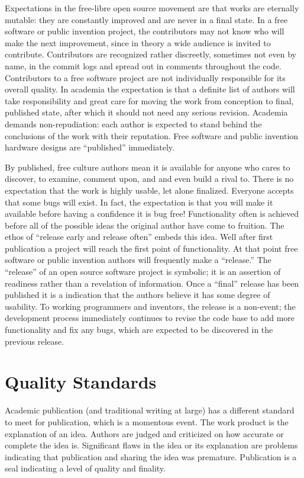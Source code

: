 \documentclass[
	fontsize=10pt, %
	twoside=false, %
	secnumdepth=1, %
]{kaobook}
\begin{document}
Expectations in the free-libre open source movement are that works are eternally mutable: they are
constantly improved and are never in a final state. In a free software
or public invention
project, the contributors may not know who will make the next
improvement, since in theory a wide audience is invited to
contribute. Contributors are recognized rather discreetly, sometimes
not even by name, in the commit logs and spread out in comments
throughout the code. Contributors to a free software project are not
individually responsible for its overall quality.  In academia the
expectation is that a definite list of authors will take
responsibility and great care for moving the work from conception to
final, published state, after which it should not need any serious
revision. Academia demands non-repudiation: each author is expected to
stand behind the conclusions of the work with their reputation.  Free
software and public invention hardware designs are “published” immediately.

By published, free culture
authors mean it is available for anyone who cares to discover, to
examine, comment upon, and and even build a rival to. There is no
expectation that the work is highly usable, let alone
finalized. Everyone accepts that some bugs will exist. In fact, the
expectation is that you will make it available before having a
confidence it is bug free! Functionality often is achieved before all
of the possible ideas the original author have come to fruition. The
ethos of “release early and release often” embeds this idea. Well
after first publication a project will reach the first point of
functionality. At that point free software or public invention authors will frequently
make a “release.” The “release” of an open source software project is
symbolic; it is an assertion of readiness rather than a revelation of
information. Once a “final” release has been published it is a
indication that the authors believe it has some degree of
usability. To working programmers and inventors, the release is a non-event; the
development process immediately continues to revise the code base to
add more functionality and fix any bugs, which are expected to be
discovered in the previous release.

\section{Quality Standards}

Academic publication (and traditional writing at large) has a
different standard to meet for publication, which is a momentous
event. The work product is the explanation of an idea. Authors are
judged and criticized on how accurate or complete the idea
is. Significant flaws in the idea or its explanation are problems
indicating that publication and sharing the idea was
premature. Publication is a seal indicating a level of quality and
finality.
\end{document}
